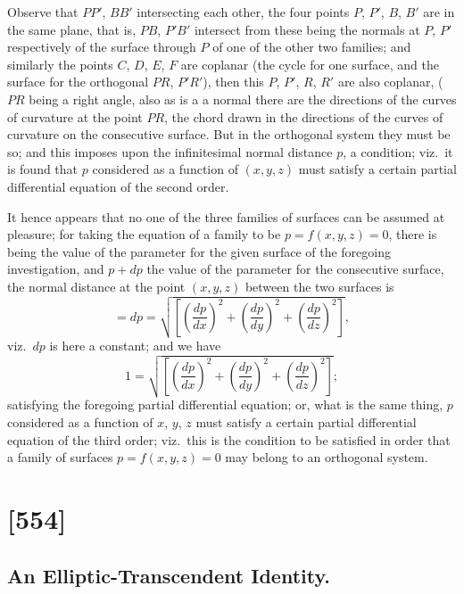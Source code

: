 \documentclass[11pt,a4paper]{article}
\theoremstyle{plain}
\theoremstyle{definition}
\begin{document}
Observe that $PP'$, $BB'$ intersecting each other, the four points $P$, $P'$, $B$, $B'$ are
in the same plane, that is, $PB$, $P'B'$ intersect from these being the normals at $P$, $P'$
respectively of the surface through $P$ of one of the other two families; and similarly
the points $C$, $D$, $E$, $F$ are coplanar (the cycle for one surface, and the surface for
the orthogonal $PR$, $P'R'$), then this $P$, $P'$, $R$, $R'$ are also coplanar, ($PR$ being a right angle, also as is a a normal there are the directions of the curves
of curvature at the point $PR$, the chord drawn in the directions of the curves of
curvature on the consecutive surface. But in the orthogonal system they must be so;
and this imposes upon the infinitesimal normal distance $p$, a condition; viz.\ it is found
that $p$ considered as a function of $(x, y, z)$ must satisfy a certain partial differential
equation of the second order.

It hence appears that no one of the three families of surfaces can be assumed
at pleasure; for taking the equation of a family to be $p = f(x, y, z) = 0$, there is being
the value of the parameter for the given surface of the foregoing investigation, and
$p + dp$ the value of the parameter for the consecutive surface, the normal distance at
the point $(x, y, z)$ between the two surfaces is
\[
= dp = \sqrt{\left[\left(\frac{dp}{dx}\right)^2 + \left(\frac{dp}{dy}\right)^2 + \left(\frac{dp}{dz}\right)^2\right]},
\]
viz.\ $dp$ is here a constant; and we have
\[
1 = \sqrt{\left[\left(\frac{dp}{dx}\right)^2 + \left(\frac{dp}{dy}\right)^2 + \left(\frac{dp}{dz}\right)^2\right]};
\]
satisfying the foregoing partial differential equation; or, what is the same thing, $p$
considered as a function of $x$, $y$, $z$ must satisfy a certain partial differential equation
of the third order; viz.\ this is the condition to be satisfied in order that a family of
surfaces $p = f(x, y, z) = 0$ may belong to an orthogonal system.

\clearpage

\section{[554]}
\subsection{An Elliptic-Transcendent Identity.}
\end{document}
